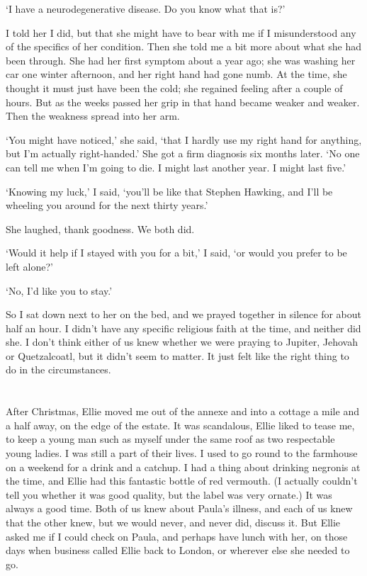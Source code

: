 `I have a neurodegenerative disease. Do you know what that is?'

I told her I did, but that she might have to bear with me if I misunderstood any of the specifics of her condition. Then she told me a bit more about what she had been through. She had her first symptom about a year ago; she was washing her car one winter afternoon, and her right hand had gone numb. At the time, she thought it must just have been the cold; she regained feeling after a couple of hours. But as the weeks passed her grip in that hand became weaker and weaker. Then the weakness spread into her arm.

`You might have noticed,' she said, `that I hardly use my right hand for anything, but I'm actually right-handed.' She got a firm diagnosis six months later. `No one can tell me when I'm going to die. I might last another year. I might last five.'

`Knowing my luck,' I said, `you'll be like that Stephen Hawking, and I'll be wheeling you around for the next thirty years.'

She laughed, thank goodness. We both did.

`Would it help if I stayed with you for a bit,' I said, `or would you prefer to be left alone?'

`No, I'd like you to stay.'

So I sat down next to her on the bed, and we prayed together in silence for about half an hour. I didn't have any specific religious faith at the time, and neither did she. I don't think either of us knew whether we were praying to Jupiter, Jehovah or Quetzalcoatl, but it didn't seem to matter. It just felt like the right thing to do in the circumstances.

\section{}

After Christmas, Ellie moved me out of the annexe and into a cottage a mile and a half away, on the edge of the estate. It was scandalous, Ellie liked to tease me, to keep a young man such as myself under the same roof as two respectable young ladies. I was still a part of their lives. I used to go round to the farmhouse on a weekend for a drink and a catchup. I had a thing about drinking negronis at the time, and Ellie had this fantastic bottle of red vermouth. (I actually couldn't tell you whether it was good quality, but the label was very ornate.) It was always a good time. Both of us knew about Paula's illness, and each of us knew that the other knew, but we would never, and never did, discuss it. But Ellie asked me if I could check on Paula, and perhaps have lunch with her, on those days when business called Ellie back to London, or wherever else she needed to go.

